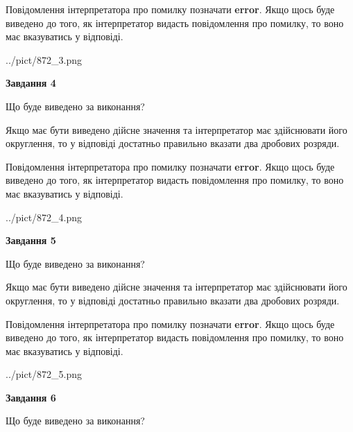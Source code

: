 \documentclass[12pt, ukrainian]{article}
\begin{document}
{\begin {Large}
Повідомлення інтерпретатора про помилку позначати \textbf{error}.
Якщо щось буде виведено до того, як інтерпретатор видасть повідомлення про помилку, 
то воно має вказуватись у відповіді. \par

\begin{center}
	{../pict/872_3.png}
\end{center}
\newpage

{\begin {center}\textbf{Завдання 4}\end {center}}\par
Що буде виведено за виконання? \par

Якщо має бути виведено дійсне значення та інтерпретатор має здійснювати його округлення, 
то у відповіді достатньо правильно вказати два дробових розряди.

Повідомлення інтерпретатора про помилку позначати \textbf{error}.
Якщо щось буде виведено до того, як інтерпретатор видасть повідомлення про помилку, 
то воно має вказуватись у відповіді. \par

\begin{center}
	{../pict/872_4.png}
\end{center}
\newpage

{\begin {center}\textbf{Завдання 5}\end {center}}\par
Що буде виведено за виконання? \par

Якщо має бути виведено дійсне значення та інтерпретатор має здійснювати його округлення, 
то у відповіді достатньо правильно вказати два дробових розряди.

Повідомлення інтерпретатора про помилку позначати \textbf{error}.
Якщо щось буде виведено до того, як інтерпретатор видасть повідомлення про помилку, 
то воно має вказуватись у відповіді. \par

\begin{center}
	{../pict/872_5.png}
\end{center}
\newpage

{\begin {center}\textbf{Завдання 6}\end {center}}\par
Що буде виведено за виконання? \par


\end{Large}}
\end{document}
